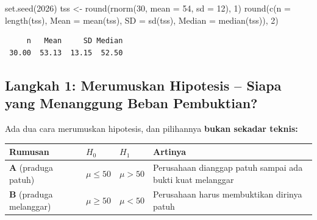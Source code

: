 \documentclass[
  indonesian,
  letterpaper,
]{book}
\newenvironment{Shaded}{\begin{snugshade}}{\end{snugshade}}
\newcommand{\AttributeTok}[1]{\textcolor[rgb]{0.40,0.45,0.13}{#1}}
\newcommand{\DecValTok}[1]{\textcolor[rgb]{0.68,0.00,0.00}{#1}}
\newcommand{\FunctionTok}[1]{\textcolor[rgb]{0.28,0.35,0.67}{#1}}
\newcommand{\NormalTok}[1]{\textcolor[rgb]{0.00,0.23,0.31}{#1}}
\newcommand{\OtherTok}[1]{\textcolor[rgb]{0.00,0.23,0.31}{#1}}
\newcounter{none} %
\begin{document}
\begin{Shaded}
\begin{Highlighting}[]
\FunctionTok{set.seed}\NormalTok{(}\DecValTok{2026}\NormalTok{)}
\NormalTok{tss }\OtherTok{\textless{}{-}} \FunctionTok{round}\NormalTok{(}\FunctionTok{rnorm}\NormalTok{(}\DecValTok{30}\NormalTok{, }\AttributeTok{mean =} \DecValTok{54}\NormalTok{, }\AttributeTok{sd =} \DecValTok{12}\NormalTok{), }\DecValTok{1}\NormalTok{)}
\FunctionTok{round}\NormalTok{(}\FunctionTok{c}\NormalTok{(}\AttributeTok{n =} \FunctionTok{length}\NormalTok{(tss), }\AttributeTok{Mean =} \FunctionTok{mean}\NormalTok{(tss), }\AttributeTok{SD =} \FunctionTok{sd}\NormalTok{(tss), }\AttributeTok{Median =} \FunctionTok{median}\NormalTok{(tss)), }\DecValTok{2}\NormalTok{)}
\end{Highlighting}
\end{Shaded}

\begin{verbatim}
     n   Mean     SD Median 
 30.00  53.13  13.15  52.50 
\end{verbatim}

\subsection{Langkah 1: Merumuskan Hipotesis -- Siapa yang Menanggung
Beban
Pembuktian?}\label{langkah-1-merumuskan-hipotesis-siapa-yang-menanggung-beban-pembuktian}

Ada dua cara merumuskan hipotesis, dan pilihannya \textbf{bukan sekadar
teknis:}

{\def\LTcaptype{none} %
\begin{longtable}[]{@{}
  >{\raggedright\arraybackslash}p{}
  >{\raggedright\arraybackslash}p{}
  >{\raggedright\arraybackslash}p{}
  >{\raggedright\arraybackslash}p{}@{}}
\toprule\noalign{}
\begin{minipage}[b]{\linewidth}\raggedright
Rumusan
\end{minipage} & \begin{minipage}[b]{\linewidth}\raggedright
\(H_0\)
\end{minipage} & \begin{minipage}[b]{\linewidth}\raggedright
\(H_1\)
\end{minipage} & \begin{minipage}[b]{\linewidth}\raggedright
Artinya
\end{minipage} \\
\midrule\noalign{}
\endhead
\bottomrule\noalign{}
\endlastfoot
\textbf{A} (praduga patuh) & \(\mu \le 50\) & \(\mu > 50\) & Perusahaan
dianggap patuh sampai ada bukti kuat melanggar \\
\textbf{B} (praduga melanggar) & \(\mu \ge 50\) & \(\mu < 50\) &
Perusahaan harus membuktikan dirinya patuh \\
\end{longtable}
}
\end{document}
